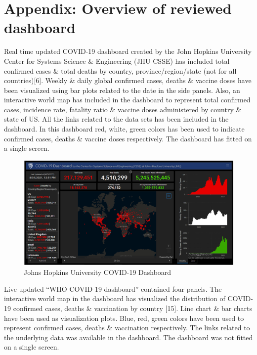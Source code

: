 \documentclass[
]{article}
\begin{document}
\hypertarget{appendix-overview-of-reviewed-dashboard}{%
\section{Appendix: Overview of reviewed
dashboard}\label{appendix-overview-of-reviewed-dashboard}}

Real time updated COVID-19 dashboard created by the John Hopkins
University Center for Systems Science \& Engineering (JHU CSSE) has
included total confirmed cases \& total deaths by country,
province/region/state (not for all countries){[}6{]}. Weekly \& daily
global confirmed cases, deaths \& vaccine doses have been visualized
using bar plots related to the date in the side panels. Also, an
interactive world map has included in the dashboard to represent total
confirmed cases, incidence rate, fatality ratio \& vaccine doses
administered by country \& state of US. All the links related to the
data sets has been included in the dashboard. In this dashboard red,
white, green colors has been used to indicate confirmed cases, deaths \&
vaccine doses respectively. The dashboard has fitted on a single screen.

\begin{figure}
\includegraphics[width=8.42in]{Images/1} \caption{Johns Hopkins University COVID-19 Dashboard}\label{fig:unnamed-chunk-1}
\end{figure}

Live updated ``WHO COVID-19 dashboard'' contained four panels. The
interactive world map in the dashboard has visualized the distribution
of COVID-19 confirmed cases, deaths \& vaccination by country {[}15{]}.
Line chart \& bar charts have been used as visualization plots. Blue,
red, green colors have been used to represent confirmed cases, deaths \&
vaccination respectively. The links related to the underlying data was
available in the dashboard. The dashboard was not fitted on a single
screen.
\end{document}
